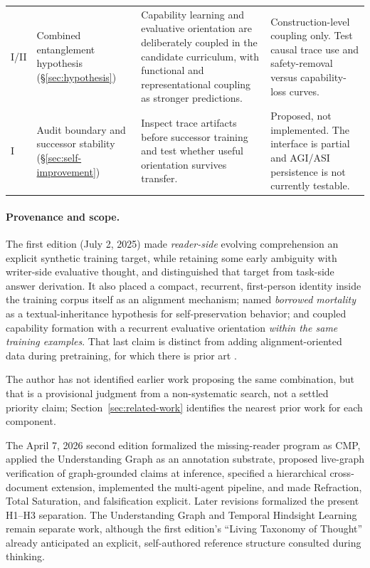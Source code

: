 \documentclass[11pt]{article}
\begin{document}
\begin{longtable}{
  >{\raggedright\arraybackslash}p{0.65cm}
  >{\raggedright\arraybackslash}p{3.35cm}
  >{\raggedright\arraybackslash}p{4.75cm}
  >{\raggedright\arraybackslash}p{4.75cm}}
\textsc{I/II} & Combined entanglement hypothesis (\S\ref{sec:hypothesis}) & Capability learning and evaluative orientation are deliberately coupled in the candidate curriculum, with functional and representational coupling as stronger predictions. & Construction-level coupling only. Test causal trace use and safety-removal versus capability-loss curves. \\
\textsc{I} & Audit boundary and successor stability (\S\ref{sec:self-improvement}) & Inspect trace artifacts before successor training and test whether useful orientation survives transfer. & Proposed, not implemented. The interface is partial and AGI/ASI persistence is not currently testable. \\
\end{longtable}
\endgroup

\paragraph{Provenance and scope.} The first edition (July 2, 2025) made
\emph{reader-side} evolving comprehension an explicit synthetic training
target, while retaining some early ambiguity with writer-side evaluative
thought, and distinguished that target from task-side answer derivation. It
also placed a compact, recurrent, first-person identity inside the training
corpus itself as an alignment mechanism; named \emph{borrowed mortality} as a
textual-inheritance hypothesis for self-preservation behavior; and coupled
capability formation with a recurrent evaluative orientation \emph{within the
same training examples}. That last claim is distinct from adding
alignment-oriented data during pretraining, for which there is prior art
\cite{korbak2023pretraining}.

The author has not identified earlier work proposing the same combination, but
that is a provisional judgment from a non-systematic search, not a settled
priority claim; Section~\ref{sec:related-work} identifies the nearest prior work
for each component.

The April 7, 2026 second edition formalized the missing-reader program as CMP,
applied the Understanding Graph as an annotation substrate, proposed live-graph
verification of graph-grounded claims at inference, specified a hierarchical
cross-document extension, implemented the multi-agent pipeline, and made
Refraction, Total Saturation, and falsification explicit. Later revisions
formalized the present H1--H3 separation. The Understanding Graph and Temporal
Hindsight Learning remain separate work, although the first edition's ``Living
Taxonomy of Thought'' already anticipated an explicit, self-authored reference
structure consulted during thinking.
\end{document}
